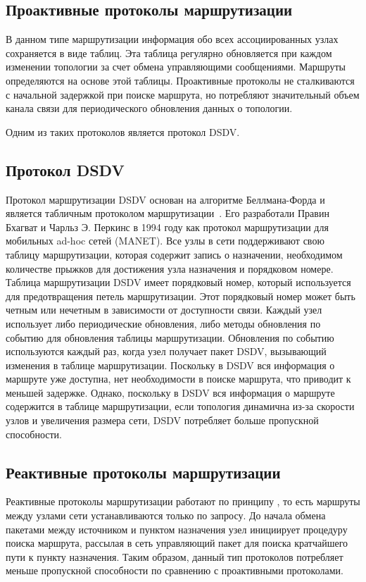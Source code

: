 \subsection*{Проактивные протоколы маршрутизации}

В данном типе маршрутизации информация обо всех ассоциированных узлах сохраняется в виде таблиц. Эта таблица регулярно обновляется при каждом изменении топологии за счет обмена управляющими сообщениями. Маршруты определяются на основе этой таблицы. Проактивные протоколы не сталкиваются с начальной задержкой при поиске маршрута, но потребляют значительный объем канала связи для периодического обновления данных о топологии.

Одним из таких протоколов является протокол DSDV.

\subsection*{Протокол DSDV}

Протокол маршрутизации DSDV основан на алгоритме Беллмана-Форда и является табличным протоколом маршрутизации~\cite{perkins1994highly}. Его разработали Правин Бхагват и Чарльз Э. Перкинс в 1994 году как протокол маршрутизации для мобильных ad-hoc сетей (MANET). Все узлы в сети поддерживают свою таблицу маршрутизации, которая содержит запись о назначении, необходимом количестве прыжков для достижения узла назначения и порядковом номере. Таблица маршрутизации DSDV имеет порядковый номер, который используется для предотвращения петель маршрутизации. Этот порядковый номер может быть четным или нечетным в зависимости от доступности связи. Каждый узел использует либо периодические обновления, либо методы обновления по событию для обновления таблицы маршрутизации. Обновления по событию используются каждый раз, когда узел получает пакет DSDV, вызывающий изменения в таблице маршрутизации. Поскольку в DSDV вся информация о маршруте уже доступна, нет необходимости в поиске маршрута, что приводит к меньшей задержке. Однако, поскольку в DSDV вся информация о маршруте содержится в таблице маршрутизации, если топология динамична из-за скорости узлов и увеличения размера сети, DSDV потребляет больше пропускной способности.

\subsection*{Реактивные протоколы маршрутизации}

Реактивные протоколы маршрутизации работают по принципу , то есть маршруты между узлами сети устанавливаются только по запросу. До начала обмена пакетами между источником и пунктом назначения узел инициирует процедуру поиска маршрута, рассылая в сеть управляющий пакет для поиска кратчайшего пути к пункту назначения. Таким образом, данный тип протоколов потребляет меньше пропускной способности по сравнению с проактивными протоколами.

